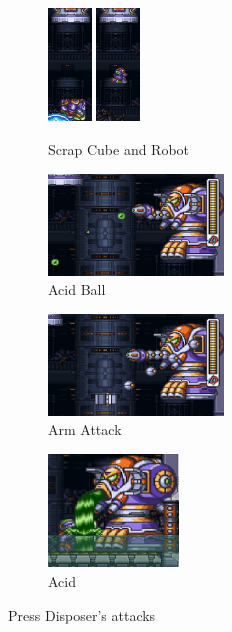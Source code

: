 \begin{figure}[htp]
	\centering
	\begin{subfigure}{\linewidth}
		\centering
		\includegraphics[height=3cm]{figures/X3/Doppler_stages/press_scrap_1.jpg}
		\includegraphics[height=3cm]{figures/X3/Doppler_stages/press_scrap_2.jpg}
		\caption{Scrap Cube and Robot}
	\end{subfigure}
	\begin{subfigure}{.4\linewidth}
		\centering
		\includegraphics[height=2.7cm]{figures/X3/Doppler_stages/press_acid.jpg}
		\caption{Acid Ball}
	\end{subfigure}
	\begin{subfigure}{.4\linewidth}
		\centering
		\includegraphics[height=2.7cm]{figures/X3/Doppler_stages/press_arm.jpg}
		\caption{Arm Attack}
	\end{subfigure}
	\begin{subfigure}{.4\linewidth}
		\centering
		\includegraphics[height=3cm]{figures/X3/Doppler_stages/press_flood.jpg}
		\caption{Acid}
	\end{subfigure}
	\caption{Press Disposer's attacks}
\end{figure}

